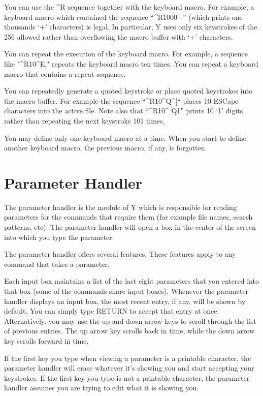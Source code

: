 
You can use the \textasciicircum R sequence together with the keyboard macro. For example, a
keyboard macro which contained the sequence ``\textasciicircum R1000+'' (which prints one
thousands `+' characters) is legal. In particular, Y uses only six keystrokes of the 256 allowed
rather than overflowing the macro buffer with `+' characters.

You can repeat the execution of the keyboard macro. For example, a sequence like
"\textasciicircum R10\textasciicircum E," repeats the keyboard macro ten times. You can repeat a
keyboard macro that contains a repeat sequence.

You can repeatedly generate a quoted keystroke or place quoted keystrokes into the macro buffer.
For example the sequence ``\textasciicircum R10\textasciicircum Q\textasciicircum [`` places 10
ESCape characters into the active file. Note also that ``\textasciicircum R10\textasciicircum
Q1'' prints 10 `1' digits rather than repeating the next keystroke 101 times.

You may define only one keyboard macro at a time. When you start to define another keyboard
macro, the previous macro, if any, is forgotten.

\section{Parameter Handler}

The parameter handler is the module of Y which is responsible for reading parameters for the
commands that require them (for example file names, search patterns, etc). The parameter handler
will open a box in the center of the screen into which you type the parameter.

The parameter handler offers several features. These features apply to any command that takes a
parameter.

Each input box maintains a list of the last eight parameters that you entered into that box
(some of the commands share input boxes). Whenever the parameter handler displays an input box,
the most recent entry, if any, will be shown by default. You can simply type RETURN to accept
that entry at once. Alternatively, you may use the up and down arrow keys to scroll through the
list of previous entries. The up arrow key scrolls back in time, while the down arrow key
scrolls forward in time.

If the first key you type when viewing a parameter is a printable character, the parameter
handler will erase whatever it's showing you and start accepting your keystrokes. If the first
key you type is not a printable character, the parameter handler assumes you are trying to edit
what it is showing you.

